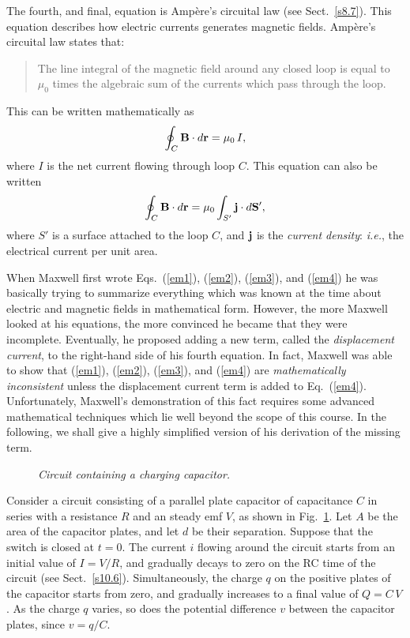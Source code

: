 The fourth, and final, equation is Amp\`{e}re's circuital law (see Sect.~\ref{s8.7}). 
This equation describes how  electric currents generates  magnetic fields.
Amp\`{e}re's circuital law states that:
\begin{quote}
{\sf The line integral of the magnetic field around any closed loop is
equal to $\mu_0$ times the algebraic sum of the currents which pass
through the loop}.
\end{quote}
This can be written mathematically as
\begin{equation}
\oint_C {\bf B}\cdot d{\bf r} = \mu_0\,I,
\end{equation}
where $I$ is the net current flowing through loop $C$. This equation
can also be written 
\begin{equation}\label{em4}
\oint_C {\bf B}\cdot d{\bf r} = \mu_0\int_{S'}{\bf j}\cdot d{\bf S}',
\end{equation}
where $S'$ is a surface attached to the loop $C$, and ${\bf j}$ is the
{\em current density}: {\em i.e.}, the electrical current per unit area.

When Maxwell first wrote Eqs.~(\ref{em1}), (\ref{em2}), (\ref{em3}), 
and (\ref{em4}) he was basically 
trying to summarize everything 
which was known at the time about electric and magnetic fields
in mathematical form. However, the more Maxwell looked at his
equations, the more convinced he became that they were incomplete.
Eventually, he proposed adding a new term, called the {\em displacement
current}, to the right-hand side of his fourth equation. In fact, Maxwell was able
to show that (\ref{em1}), (\ref{em2}), (\ref{em3}), 
and (\ref{em4})  are {\em mathematically inconsistent}\/ unless
the displacement current term is added  to Eq.~(\ref{em4}). Unfortunately,
Maxwell's 
demonstration of this fact  requires some advanced mathematical
techniques  which lie well beyond the scope of this course. 
In the following,
we shall give a highly simplified version of his derivation of the
missing term. 

\begin{figure}[h]
\epsfysize=2in
\centerline{}
\caption{\em Circuit containing a charging capacitor.}\label{f11.1}
\end{figure}

Consider a circuit
consisting of a parallel plate capacitor of capacitance $C$ in series with a
resistance  $R$ and an steady emf $V$, as shown in Fig.~\ref{f11.1}. Let $A$ be the area of
the capacitor plates, and let $d$ be their separation. Suppose that
the switch is closed at $t=0$. The current $i$ flowing around the circuit
starts from an initial value of $I=V/R$, and gradually decays to zero
on the RC time of the circuit (see Sect.~\ref{s10.6}). 
Simultaneously, the charge $q$ on the
positive plates of the capacitor starts from zero, and gradually increases
to a final value of $Q=C\,V$. As the charge $q$ varies, so does the
potential
difference $v$ between the capacitor plates, since $v=q/C$. 

